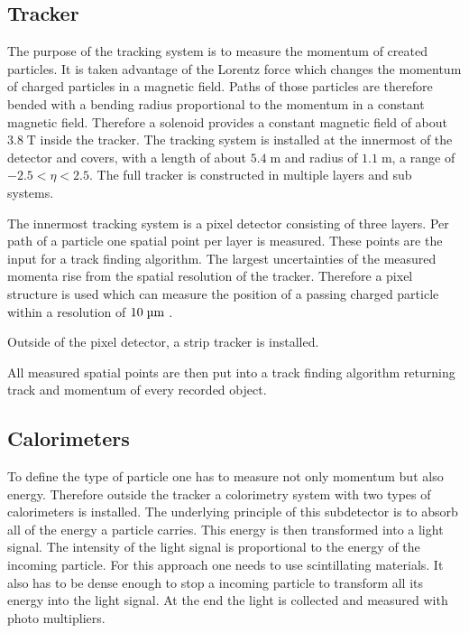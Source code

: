 \subsection{Tracker}
\label{sec:tracker}

	The purpose of the tracking system is to measure the momentum of created particles. It is taken advantage of the Lorentz force which changes the momentum of charged particles in a magnetic field. Paths of those particles are therefore bended with a bending radius proportional to the momentum in a constant magnetic field. Therefore a solenoid provides a constant magnetic field of about $3.8\;\text{T}$ inside the tracker. The tracking system is installed at the innermost of the detector and covers, with a length of about $5.4\;\text{m}$ and radius of $1.1\;\text{m}$, a range of $-2.5 < \eta < 2.5$. The full tracker is constructed in multiple layers and sub systems. 
	
	The innermost tracking system is a pixel detector consisting of three layers. Per path of a particle one spatial point per layer is measured. These points are the input for a track finding algorithm. The largest uncertainties of the measured momenta rise from the spatial resolution of the tracker. Therefore a pixel structure is used which can measure the position of a passing charged particle within a resolution of $10\;\text{\textmu m}$ \cite{CMStracks}. 
	
	Outside of the pixel detector, a strip tracker is installed.
	
	All measured spatial points are then put into a track finding algorithm returning track and momentum of every recorded object.

\subsection{Calorimeters}
	To define the type of particle one has to measure not only momentum but also energy. Therefore outside the tracker a colorimetry system with two types of calorimeters is installed. The underlying principle of this subdetector is to absorb all of the energy a particle carries. This energy is then transformed into a light signal. The intensity of the light signal is proportional to the energy of the incoming particle. For this approach one needs to use scintillating materials. It also has to be dense enough to stop a incoming particle to transform all its energy into the light signal. At the end the light is collected and measured with photo multipliers.
